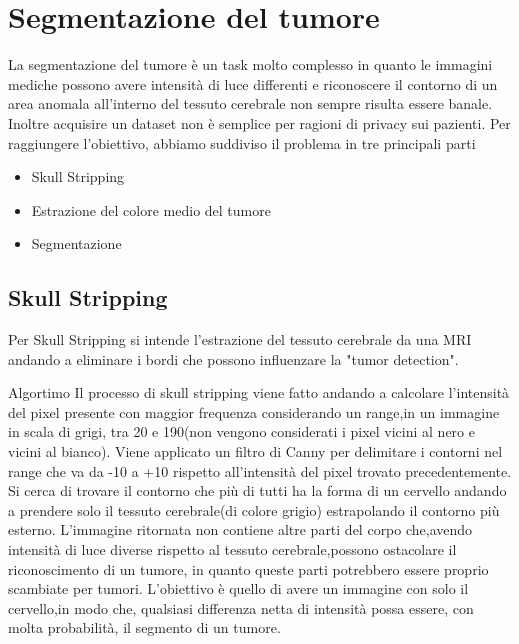 \documentclass{article}
\begin{document}
\section{Segmentazione del tumore}
La segmentazione del tumore è un task molto complesso in quanto le immagini mediche possono avere intensità di luce differenti e riconoscere il contorno di un area anomala all'interno del tessuto cerebrale non sempre risulta essere banale.
Inoltre acquisire un dataset non è semplice per ragioni di privacy sui pazienti.
Per raggiungere l'obiettivo, abbiamo suddiviso il problema in tre principali parti
\begin{itemize}
    \item Skull Stripping
    \item Estrazione del colore medio del tumore
    \item Segmentazione
\end{itemize}
\subsection{Skull Stripping}
Per Skull Stripping si intende l'estrazione del tessuto cerebrale da una MRI andando a eliminare i bordi che possono influenzare la "tumor detection".

\begin{my theorem}{Algortimo}
    Il processo di skull stripping viene fatto andando a calcolare l'intensità del pixel presente con maggior frequenza considerando un range,in un immagine in scala di grigi, tra 20 e 190(non vengono considerati i pixel vicini al nero e vicini al bianco).
    Viene applicato un filtro di Canny per delimitare i contorni nel range che va da -10 a +10 rispetto all'intensità del pixel trovato precedentemente.
    Si cerca di trovare il contorno che più di tutti ha la forma di un cervello andando a prendere solo il tessuto cerebrale(di colore grigio) estrapolando il contorno più esterno.
    L'immagine ritornata non contiene altre parti del corpo che,avendo intensità di luce diverse rispetto al tessuto cerebrale,possono ostacolare il riconoscimento di un tumore, in quanto queste parti potrebbero essere proprio scambiate per tumori.
    L'obiettivo è quello di avere un immagine con solo il cervello,in modo che, qualsiasi differenza netta di intensità possa essere, con molta probabilità, il segmento di un tumore.
\end{my theorem}
\end{document}
